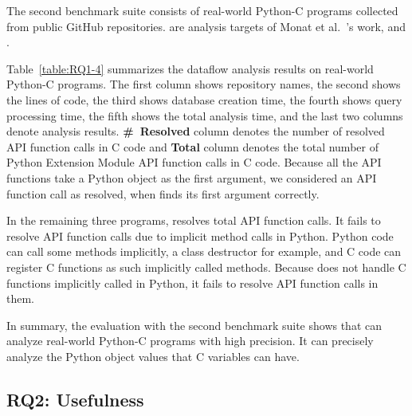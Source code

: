 

The second benchmark suite consists of  real-world Python-C programs
collected from public GitHub repositories.  are analysis
targets of Monat et al.~\cite{sas2021}'s work, and .

Table~\ref{table:RQ1-4} summarizes the dataflow analysis results on 
real-world Python-C programs. 
The first column shows repository names, the second shows the lines of code,
the third shows database creation time,
the fourth shows query processing time, the fifth shows the total analysis time,
and the last two columns denote analysis results.
{\bf \#~Resolved} column denotes the number of resolved API function calls in C code and
{\bf Total} column denotes the total number of Python Extension Module API function
calls in C code. 
Because all the API functions take a Python object as the first argument, we
considered an API function call as resolved, when \ours finds its first argument
correctly. 


In the remaining three programs, \ours resolves  total
API function calls. 
It fails to resolve  API function calls due to implicit method calls in Python. 
Python code can call some methods implicitly, a class destructor for example, and C
code can register C functions as such implicitly called methods. 
Because \ours does not handle C functions implicitly called in Python, it
fails to resolve API function calls in them.

In summary, the evaluation with the second benchmark suite shows that
\ours can analyze real-world Python-C programs with high precision.
It can precisely analyze the Python object values that C variables can have.



\subsection{RQ2: Usefulness}

